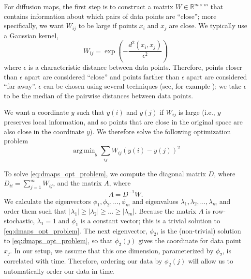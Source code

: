 \documentclass{pnastwo}
\DeclareMathOperator*{\argmin}{arg\,min}
\begin{document}
\begin{article}
\begin{materials}
For diffusion maps, the first step is to construct a matrix $W \in \mathbb{R}^{m \times m}$ that contains information about which pairs of data points are ``close''; more specifically, we want $W_{ij}$ to be large if points $x_i$ and $x_j$ are close. 
%
%
We typically use a Gaussian kernel, 
\begin{equation} \label{eq:dmaps_W}
W_{ij} = \exp \left( -\frac{d^2(x_i, x_j)}{\epsilon^2} \right)
\end{equation}
where $\epsilon$ is a characteristic distance between data points.
%
Therefore, points closer than $\epsilon$ apart are considered ``close'' and points farther than $\epsilon$ apart are considered ``far away''.
%
$\epsilon$ can be chosen using several techniques (see, for example \cite{coifman2008graph}); we take $\epsilon$ to be the median of the pairwise distances between data points.

We want a coordinate $y$ such that $y(i)$ and $y(j)$ if $W_{ij}$ is large (i.e., $y$ preserves local information, and so points that are close in the original space are also close in the coordinate $y$).
%
We therefore solve the following optimization problem \cite{Belkin2003}
\begin{equation} \label{eq:dmaps_opt_problem}
\argmin_{y} \sum_{ij} W_{ij} (y(i) - y(j))^2
\end{equation}
%

To solve \eqref{eq:dmaps_opt_problem}, we compute the diagonal matrix $D$, where $D_{ii} = \sum_{j=1}^{m} W_{ij}$, and the matrix $A$, where
\begin{equation} \label{eq:dmaps_A}
A = D^{-1} W.
\end{equation} 
%
We calculate the eigenvectors $\phi_1, \phi_2, \dots, \phi_m$ and eigenvalues $\lambda_1, \lambda_2, \dots, \lambda_m$ and order them such that $|\lambda_1| \ge |\lambda_2| \ge \dots \ge |\lambda_m|$.
%
%
Because the matrix $A$ is row-stochastic, $\lambda_1=1$ and $\phi_1$ is a constant vector; this is a trivial solution to \eqref{eq:dmaps_opt_problem}.
%
%
The next eigenvector, $\phi_2$, is the (non-trivial) solution to \eqref{eq:dmaps_opt_problem}, so that $\phi_2(j)$ gives the coordinate for data point $x_j$.
%
In our setup, we assume that this one dimension, parameterized by $\phi_2$, is correlated with time.
%
Therefore, ordering our data by $\phi_2(j)$ will allow us to automatically order our data in time.


\end{materials}
\end{article}
\end{document}
